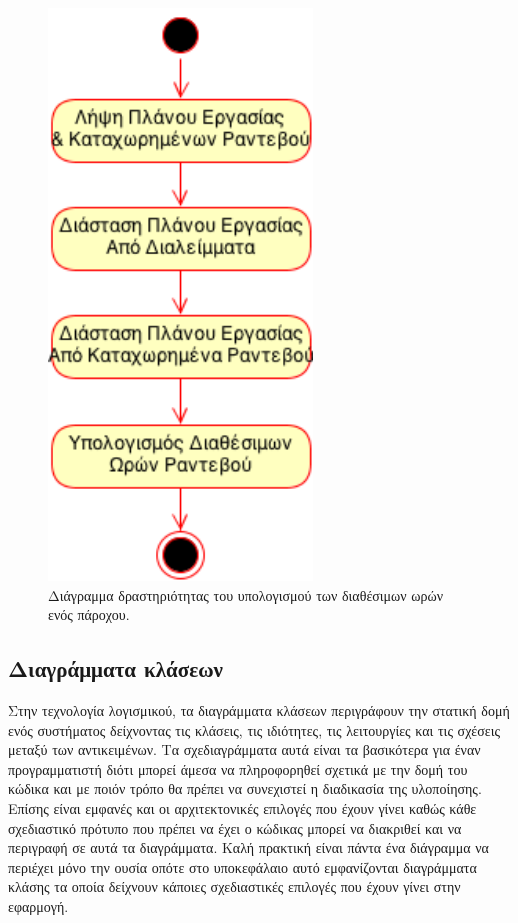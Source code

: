 \begin{figure}
\centering
\includegraphics[width=70mm]{images/ad-provider-available-hours.png}
\caption{Διάγραμμα δραστηριότητας του υπολογισμού των διαθέσιμων ωρών ενός πάροχου.}
\label{ad-provider-available-hours}
\end{figure}

\subsection{Διαγράμματα κλάσεων}
Στην τεχνολογία λογισμικού, τα διαγράμματα κλάσεων περιγράφουν την στατική δομή ενός συστήματος δείχνοντας τις κλάσεις, τις ιδιότητες, τις λειτουργίες και τις σχέσεις μεταξύ των αντικειμένων. Τα σχεδιαγράμματα αυτά είναι τα βασικότερα για έναν προγραμματιστή διότι μπορεί άμεσα να πληροφορηθεί σχετικά με την δομή του κώδικα και με ποιόν τρόπο θα πρέπει να συνεχιστεί η διαδικασία της υλοποίησης. Επίσης είναι εμφανές και οι αρχιτεκτονικές επιλογές που έχουν γίνει καθώς κάθε σχεδιαστικό πρότυπο που πρέπει να έχει ο κώδικας μπορεί να διακριθεί και να περιγραφή σε αυτά τα διαγράμματα. Καλή πρακτική είναι πάντα ένα διάγραμμα να περιέχει μόνο την ουσία οπότε στο υποκεφάλαιο αυτό εμφανίζονται διαγράμματα κλάσης τα οποία δείχνουν κάποιες σχεδιαστικές επιλογές που έχουν γίνει στην εφαρμογή.

